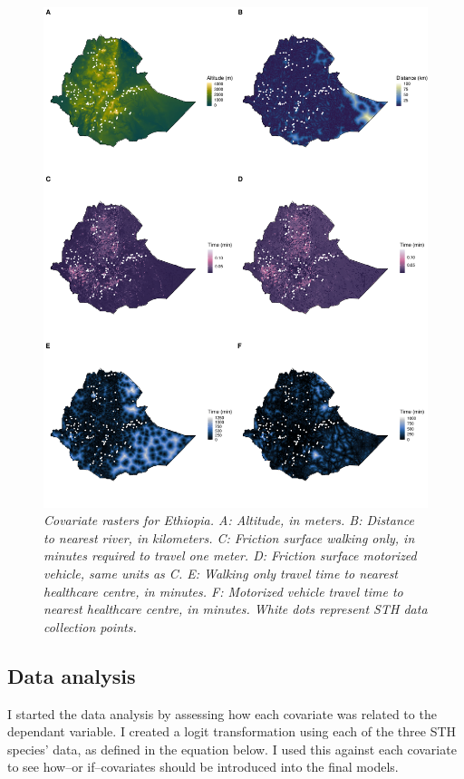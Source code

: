 \documentclass[
]{article}
\begin{document}
\begin{figure}
\centering
\includegraphics{write_up_files/figure-latex/covariates_figure-1.pdf}
\caption{\textit{Covariate rasters for Ethiopia. A: Altitude, in meters. B: Distance to nearest river, in kilometers. C: Friction surface walking only, in minutes required to travel one meter. D: Friction surface motorized vehicle, same units as C. E: Walking only travel time to nearest healthcare centre, in minutes. F: Motorized vehicle travel time to nearest healthcare centre, in minutes. White dots represent STH data collection points.}}
\end{figure}

\hypertarget{data-analysis}{%
\subsection{Data analysis}\label{data-analysis}}

I started the data analysis by assessing how each covariate was related
to the dependant variable. I created a logit transformation using each
of the three STH species' data, as defined in the equation below. I used
this against each covariate to see how--or if--covariates should be
introduced into the final models.
\end{document}
